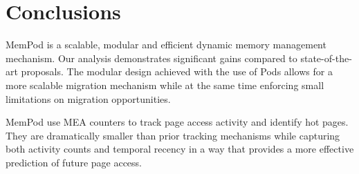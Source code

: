 \section{Conclusions}
\label{sec:Conclusions}

MemPod is a scalable, modular and efficient dynamic memory management mechanism. Our analysis demonstrates significant gains compared to state-of-the-art proposals. The modular design achieved with the use of Pods allows for a more scalable migration mechanism while at the same time enforcing small limitations on migration opportunities.

MemPod use MEA counters to track page access activity and identify hot
pages.  They are dramatically smaller than prior tracking mechanisms
while capturing both activity counts and temporal recency in a way that
provides a more effective prediction of future page access.



